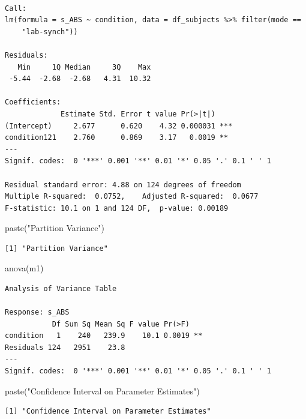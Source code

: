 \documentclass[
  letterpaper,
  DIV=11,
  numbers=noendperiod]{scrreprt}
\newenvironment{Shaded}{\begin{snugshade}}{\end{snugshade}}
\newcommand{\FunctionTok}[1]{\textcolor[rgb]{0.28,0.35,0.67}{#1}}
\newcommand{\NormalTok}[1]{\textcolor[rgb]{0.00,0.23,0.31}{#1}}
\newcommand{\StringTok}[1]{\textcolor[rgb]{0.13,0.47,0.30}{#1}}
\begin{document}
\begin{verbatim}

Call:
lm(formula = s_ABS ~ condition, data = df_subjects %>% filter(mode == 
    "lab-synch"))

Residuals:
   Min     1Q Median     3Q    Max 
 -5.44  -2.68  -2.68   4.31  10.32 

Coefficients:
             Estimate Std. Error t value Pr(>|t|)    
(Intercept)     2.677      0.620    4.32 0.000031 ***
condition121    2.760      0.869    3.17   0.0019 ** 
---
Signif. codes:  0 '***' 0.001 '**' 0.01 '*' 0.05 '.' 0.1 ' ' 1

Residual standard error: 4.88 on 124 degrees of freedom
Multiple R-squared:  0.0752,    Adjusted R-squared:  0.0677 
F-statistic: 10.1 on 1 and 124 DF,  p-value: 0.00189
\end{verbatim}

\begin{Shaded}
\begin{Highlighting}[]
\FunctionTok{paste}\NormalTok{(}\StringTok{"Partition Variance"}\NormalTok{)}
\end{Highlighting}
\end{Shaded}

\begin{verbatim}
[1] "Partition Variance"
\end{verbatim}

\begin{Shaded}
\begin{Highlighting}[]
\FunctionTok{anova}\NormalTok{(m1)}
\end{Highlighting}
\end{Shaded}

\begin{verbatim}
Analysis of Variance Table

Response: s_ABS
           Df Sum Sq Mean Sq F value Pr(>F)   
condition   1    240   239.9    10.1 0.0019 **
Residuals 124   2951    23.8                  
---
Signif. codes:  0 '***' 0.001 '**' 0.01 '*' 0.05 '.' 0.1 ' ' 1
\end{verbatim}

\begin{Shaded}
\begin{Highlighting}[]
\FunctionTok{paste}\NormalTok{(}\StringTok{"Confidence Interval on Parameter Estimates"}\NormalTok{)}
\end{Highlighting}
\end{Shaded}

\begin{verbatim}
[1] "Confidence Interval on Parameter Estimates"
\end{verbatim}
\end{document}
